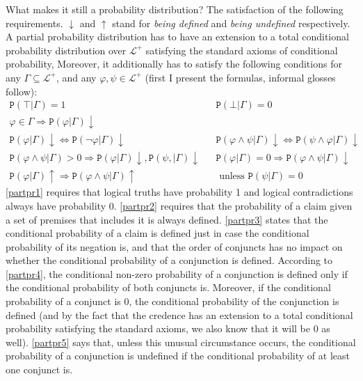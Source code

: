\documentclass[10pt,leqno]{article}
\newcommand{\n}{\neg}
\newcommand{\et}{\wedge}
\newcommand{\pr}[1]{\mbox{$\mathtt{P}(#1)$}}
\newcommand{\df}[1]{\mbox{$\pr{#1}\downarrow$}}
\newcommand{\ndf}[1]{\mbox{$\pr{#1}\uparrow$}}
\begin{document}
 What makes it still a probability distribution? The satisfaction of the following requirements. 
  $\downarrow$ and $\uparrow$ stand for \emph{being defined} and \emph{being undefined} respectively. 
 A partial probability distribution has to have  an extension to a total conditional probability distribution over $\mathcal{L^+}$  satisfying the standard axioms of conditional probability,  Moreover, it  additionally has to satisfy  the following conditions  for any $\Gamma \subseteq \mathcal{L}^+$, and any $\varphi, \psi\in \mathcal{L^+}$ (first I present the formulas, informal glosses follow):
 \begin{align}
 \tag{Part-1} \label{partpr1} \pr{\top\vert \Gamma}=1 & & \pr{\bot\vert \Gamma}=0\\
 \tag{Part-2} \label{partpr2} \varphi \in \Gamma \Rightarrow \df{\varphi\vert \Gamma} \\
  \tag{Part-3} \label{partpr3} \df{\varphi\vert \Gamma} \Leftrightarrow \df{\n \varphi\vert \Gamma}  & &  \df{\varphi \et \psi\vert \Gamma} \Leftrightarrow \df{\psi \et \varphi\vert \Gamma}  \\
  \tag{Part-4}\label{partpr4}\pr{\varphi \et \psi\vert \Gamma}>0 \Rightarrow \df{\varphi\vert \Gamma}, \df{\psi, \vert \Gamma} & & \pr{\varphi\vert \Gamma}=0 \Rightarrow \df{\varphi \et \psi\vert \Gamma}\\
 \tag{Part-5}\label{partpr5} \ndf{\varphi\vert \Gamma} \Rightarrow \ndf{\varphi \et \psi\vert \Gamma} & & \mbox{ unless } \pr{\psi\vert \Gamma}=0 %
 \end{align}
 \eqref{partpr1} requires that logical truths  have probability 1 and logical contradictions always have probability 0. \eqref{partpr2} requires that the probability of a claim given a set of premises that includes it is always defined. \eqref{partpr3} states that the conditional probability of a claim is defined just in case the conditional probability of its negation is, and that the order of conjuncts has no impact on whether the conditional probability of a conjunction is defined. According to \eqref{partpr4}, the conditional non-zero probability of a conjunction is defined  only if the conditional probability of both conjuncts is. Moreover, if the conditional probability of a conjunct is 0, the conditional probability of the conjunction is defined (and by the fact that the credence has an extension to a total conditional probability satisfying the standard axioms, we also know that it will be 0 as well). \eqref{partpr5} says that, unless this unusual circumstance occurs, the conditional probability of a conjunction is undefined if the conditional probability of at least one conjunct is.  %
 
\end{document}

